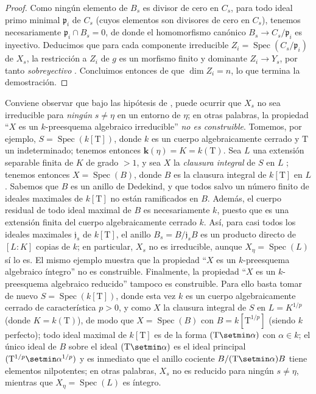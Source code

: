\begin{proof}
Como ningún elemento de $B_s$ es divisor de cero en $C_s$, para todo ideal primo minimal $\mathfrak{p}_i$ de $C_s$ (cuyos elementos son divisores de cero en $C_s$), tenemos necesariamente $\mathfrak{p}_i\cap B_s=0$, de donde el homomorfismo canónico $B_s\to C_s/\mathfrak{p}_i$ es inyectivo.
Deducimos que para cada componente irreducible $Z_i=\operatorname{Spec}(C_s/\mathfrak{p}_i)$ de $X_s$, la restricción a $Z_i$ de $g$ es un morfismo finito y dominante $Z_i\to Y_s$, por tanto \emph{sobreyectivo} .
Concluimos entonces de  que $\dim Z_i=n$, lo que termina la demostración.
\end{proof}

\begin{remark}[9.5.7]
\label{IV.9.5.7}
Conviene observar que bajo las hipótesis de , puede ocurrir que $X_s$ no sea irreducible para \emph{ningún} $s\neq\eta$ en un entorno de $\eta$; en otras palabras, la propiedad ``$X$ es un $k$-preesquema algebraico irreducible'' \emph{no es construible}.
Tomemos, por ejemplo, $S=\operatorname{Spec}(k[\mathrm{T}])$, donde $k$ es un cuerpo algebraicamente cerrado y $\mathrm{T}$ un indeterminado; tenemos entonces $\boldsymbol{k}(\eta)=K=k(\mathrm{T})$.
Sea $L$ una extensión separable finita de $K$ de grado $>1$, y sea $X$ la \emph{clausura integral} de $S$ en $L$ ; tenemos entonces $X=\operatorname{Spec}(B)$, donde $B$ es la clausura integral de $k[\mathrm{T}]$ en $L$.
Sabemos que $B$ es un anillo de Dedekind, y que todos salvo un número finito de ideales maximales de $k[\mathrm{T}]$ no están ramificados en $B$. Además, el cuerpo residual de todo ideal maximal de $B$ es necesariamente $k$, puesto que es una extensión finita del cuerpo algebraicamente cerrado $k$. Así, para casi todos los ideales maximales $\mathfrak{j}_s$ de $k[\mathrm{T}]$, el anillo $B_s=B/\mathfrak{j}_s B$ es un producto directo de $[L:K]$ copias de $k$; en particular, $X_s$ no es irreducible, aunque $X_\eta=\operatorname{Spec}(L)$ sí lo es.
El mismo ejemplo muestra que la propiedad ``$X$ es un $k$-preesquema algebraico íntegro'' no es construible.
Finalmente, la propiedad ``$X$ es un $k$-preesquema algebraico reducido'' tampoco es construible.
Para ello basta tomar de nuevo $S=\operatorname{Spec}(k[\mathrm{T}])$, donde esta vez $k$ es un cuerpo algebraicamente cerrado de característica $p>0$, y como $X$ la clausura integral de $S$ en $L=K^{1/p}$ (donde $K=k(\mathrm{T})$), de modo que $X=\operatorname{Spec}(B)$ con $B=k[\mathrm{T}^{1/p}]$ (siendo $k$ perfecto); todo ideal maximal de $k[\mathrm{T}]$ es de la forma $(\mathrm{T}\setmin\alpha)$ con $\alpha\in k$; el único ideal de $B$ sobre el ideal $(\mathrm{T}\setmin\alpha)$ es el ideal principal $(\mathrm{T}^{1/p}\setmin\alpha^{1/p})$ y es inmediato
que el anillo cociente $B/(\mathrm{T}\setmin\alpha)B$ tiene elementos nilpotentes; en otras palabras, $X_s$ no es reducido para ningún $s\neq\eta$, mientras que $X_\eta=\operatorname{Spec}(L)$ es íntegro.


\end{remark}
